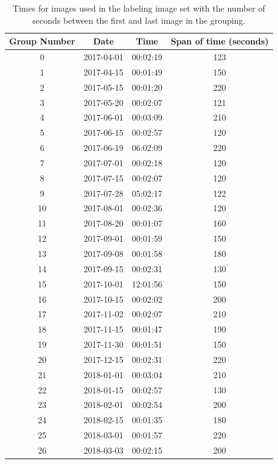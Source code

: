 \documentclass[twoside]{report}
\begin{document}
\begin{table}[ht!]
  \centering
  \begin{tabular}{|c c c c|}
    \hline
    Group Number & Date & Time & Span of time (seconds) \\
    \hline
    0 & 2017-04-01 & 00:02:19 & 123 \\
    1 & 2017-04-15 & 00:01:49 & 150 \\
    2 & 2017-05-15 & 00:01:20 & 220 \\
    3 & 2017-05-20 & 00:02:07 & 121 \\
    4 & 2017-06-01 & 00:03:09 & 210 \\
    5 & 2017-06-15 & 00:02:57 & 120 \\
    6 & 2017-06-19 & 06:02:09 & 220 \\
    7 & 2017-07-01 & 00:02:18 & 120 \\
    8 & 2017-07-15 & 00:02:07 & 120 \\
    9 & 2017-07-28 & 05:02:17 & 122 \\
    10 & 2017-08-01 & 00:02:36 & 120 \\
    11 & 2017-08-20 & 00:01:07 & 160 \\
    12 & 2017-09-01 & 00:01:59 & 150 \\
    13 & 2017-09-08 & 00:01:58 & 180 \\
    14 & 2017-09-15 & 00:02:31 & 130 \\
    15 & 2017-10-01 & 12:01:56 & 150 \\
    16 & 2017-10-15 & 00:02:02 & 200 \\
    17 & 2017-11-02 & 00:02:07 & 210 \\
    18 & 2017-11-15 & 00:01:47 & 190 \\
    19 & 2017-11-30 & 00:01:51 & 150 \\
    20 & 2017-12-15 & 00:02:31 & 220 \\
    21 & 2018-01-01 & 00:03:04 & 210 \\
    22 & 2018-01-15 & 00:02:57 & 130 \\
    23 & 2018-02-01 & 00:02:54 & 200 \\
    24 & 2018-02-15 & 00:01:35 & 180 \\
    25 & 2018-03-01 & 00:01:57 & 220 \\
    26 & 2018-03-03 & 00:02:15 & 200 \\
    \hline
  \end{tabular}
  \caption{Times for images used in the labeling image set with the number of seconds between the first and last image in the grouping. }
  \label{tab:labelingtimes}
\end{table}
\end{document}
